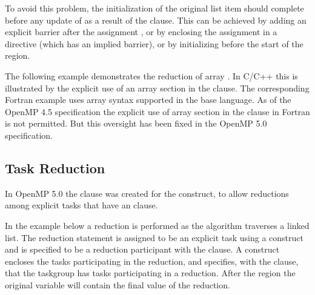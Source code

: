 To avoid this problem, the initialization of the original list item  
should complete before any update of  as a result of the  
clause. This can be achieved by adding an explicit barrier after the assignment 
, or by enclosing the assignment  in a  
directive (which has an implied barrier), or by initializing  before 
the start of the  region.



The following example demonstrates the reduction of array .  In C/C++ this is illustrated by the explicit use of an array section  in the  clause.  The corresponding Fortran example uses array syntax supported in the base language.  As of the OpenMP 4.5 specification the explicit use of array section in the  clause in Fortran is not permitted.  But this oversight has been fixed in the OpenMP 5.0 specification.




\subsection{Task Reduction}
\label{subsec:task_reduction}

In OpenMP 5.0 the  clause was created for the  construct, 
to allow reductions among explicit tasks that have an  clause.

In the  example below a reduction is performed as the algorithm
traverses a linked list. The reduction statement is assigned to be an explicit task using
a  construct and is specified to be a reduction participant with 
the  clause.
A  construct encloses the tasks participating in the reduction, and
specifies, with the  clause, that the taskgroup has tasks participating
in a reduction.  After the  region the original variable will contain 
the final value of the reduction.

